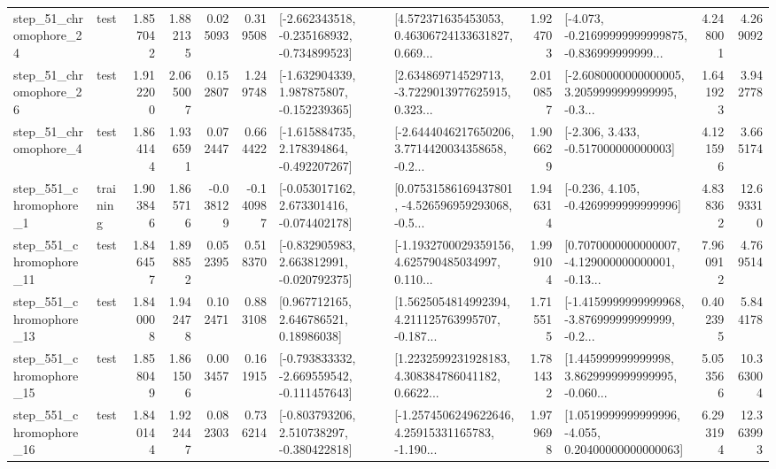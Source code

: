 \begin{tabular}{llrrrrllrlrr}
   step\_51\_chromophore\_24 &      test &      1.857042 &    1.882135 &      0.025093 &  0.319508 &  [-2.662343518, -0.235168932, -0.734899523] &  [4.572371635453053, 0.46306724133631827, 0.669... &       1.924703 &  [-4.073, -0.21699999999999875, -0.836999999999... &            4.248001 &          4.269092 \\
   step\_51\_chromophore\_26 &      test &      1.912200 &    2.065007 &      0.152807 &  1.249748 &   [-1.632904339, 1.987875807, -0.152239365] &  [2.634869714529713, -3.7229013977625915, 0.323... &       2.010857 &  [-2.6080000000000005, 3.2059999999999995, -0.3... &            1.641923 &          3.942778 \\
    step\_51\_chromophore\_4 &      test &      1.864144 &    1.936591 &      0.072447 &  0.664422 &   [-1.615884735, 2.178394864, -0.492207267] &  [-2.6444046217650206, 3.7714420034358658, -0.2... &       1.906629 &                [-2.306, 3.433, -0.517000000000003] &            4.121596 &          3.665174 \\
   step\_551\_chromophore\_1 &  training &      1.903846 &    1.865716 &     -0.038129 & -0.140987 &   [-0.053017162, 2.673301416, -0.074402178] &  [0.07531586169437801, -4.526596959293068, -0.5... &       1.946314 &               [-0.236, 4.105, -0.4269999999999996] &            4.838362 &         12.693310 \\
  step\_551\_chromophore\_11 &      test &      1.846457 &    1.898852 &      0.052395 &  0.518370 &   [-0.832905983, 2.663812991, -0.020792375] &  [-1.1932700029359156, 4.625790485034997, 0.110... &       1.999104 &  [0.7070000000000007, -4.129000000000001, -0.13... &            7.960912 &          4.769514 \\
  step\_551\_chromophore\_13 &      test &      1.840008 &    1.942478 &      0.102471 &  0.883108 &      [0.967712165, 2.646786521, 0.18986038] &  [1.5625054814992394, 4.211125763995707, -0.187... &       1.715515 &  [-1.4159999999999968, -3.876999999999999, -0.2... &            0.402395 &          5.844178 \\
  step\_551\_chromophore\_15 &      test &      1.858049 &    1.861506 &      0.003457 &  0.161915 &  [-0.793833332, -2.669559542, -0.111457643] &  [1.2232599231928183, 4.308384786041182, 0.6622... &       1.781432 &  [1.445999999999998, 3.8629999999999995, -0.060... &            5.053566 &         10.363004 \\
  step\_551\_chromophore\_16 &      test &      1.840144 &    1.922447 &      0.082303 &  0.736214 &   [-0.803793206, 2.510738297, -0.380422818] &  [-1.2574506249622646, 4.25915331165783, -1.190... &       1.979698 &  [1.0519999999999996, -4.055, 0.20400000000000063] &            6.293194 &         12.363993 \\

\end{tabular}
